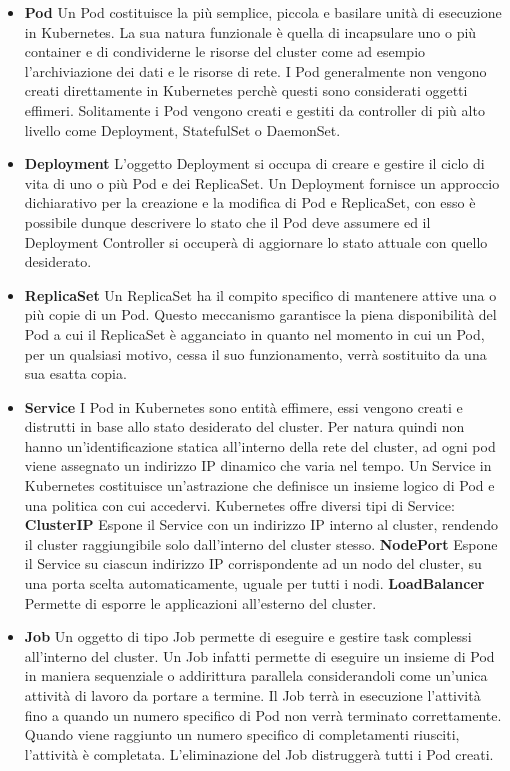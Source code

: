 \begin{itemize}
    \item\textbf{Pod}
    Un Pod costituisce la più semplice, piccola e basilare unità di esecuzione in Kubernetes. La sua natura funzionale è quella di incapsulare uno o più container e di condividerne le risorse del cluster come ad esempio l'archiviazione dei dati e le risorse di rete.
    I Pod generalmente non vengono creati direttamente in Kubernetes perchè questi sono considerati oggetti effimeri. Solitamente i Pod vengono creati e gestiti da controller di più alto livello come Deployment, StatefulSet o DaemonSet.
    \item\textbf{Deployment}
    L'oggetto Deployment si occupa di creare e gestire il ciclo di vita di uno o più Pod e dei ReplicaSet.
    Un Deployment fornisce un approccio dichiarativo per la creazione e la modifica di Pod e ReplicaSet, con esso è possibile dunque descrivere lo stato che il Pod deve assumere ed il Deployment Controller si occuperà di aggiornare lo stato attuale con quello desiderato.
    \item\textbf{ReplicaSet}
    Un ReplicaSet ha il compito specifico di mantenere attive una o più copie di un Pod. Questo meccanismo garantisce la piena disponibilità del Pod a cui il ReplicaSet è agganciato in quanto nel momento in cui un Pod, per un qualsiasi motivo, cessa il suo funzionamento, verrà sostituito da una sua esatta copia.
    \item\textbf{Service}
    I Pod in Kubernetes sono entità effimere, essi vengono creati e distrutti in base allo stato desiderato del cluster. Per natura quindi non hanno un'identificazione statica all'interno della rete del cluster, ad ogni pod viene assegnato un indirizzo IP dinamico che varia nel tempo.
    Un Service in Kubernetes costituisce un'astrazione che definisce un insieme logico di Pod e una politica con cui accedervi.
    Kubernetes offre diversi tipi di Service:
        \subitem\textbf{ClusterIP} Espone il Service con un indirizzo IP interno al cluster, rendendo il cluster raggiungibile solo dall'interno del cluster stesso.
        \subitem\textbf{NodePort} Espone il Service su ciascun indirizzo IP corrispondente ad un nodo del cluster, su una porta scelta automaticamente, uguale per tutti i nodi.
        \subitem\textbf{LoadBalancer} Permette di esporre le applicazioni all'esterno del cluster.
    \item\textbf{Job}
    Un oggetto di tipo Job permette di eseguire e gestire task complessi all'interno del cluster. Un Job infatti permette di eseguire un insieme di Pod in maniera sequenziale o addirittura parallela considerandoli come un'unica attività di lavoro da portare a termine. Il Job terrà in esecuzione l'attività fino a quando un numero specifico di Pod non verrà terminato correttamente. Quando viene raggiunto un numero specifico di completamenti riusciti, l'attività è completata. L'eliminazione del Job distruggerà tutti i Pod creati. 
\end{itemize}